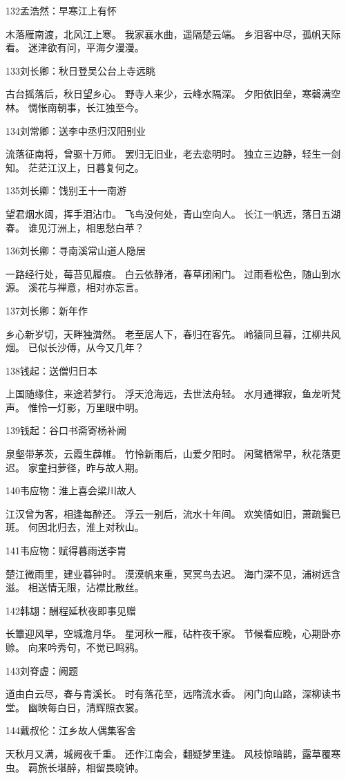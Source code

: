 132孟浩然：早寒江上有怀

木落雁南渡，北风江上寒。
我家襄水曲，遥隔楚云端。
乡泪客中尽，孤帆天际看。
迷津欲有问，平海夕漫漫。

133刘长卿：秋日登吴公台上寺远眺

古台摇落后，秋日望乡心。
野寺人来少，云峰水隔深。
夕阳依旧垒，寒磬满空林。
惆怅南朝事，长江独至今。

134刘常卿：送李中丞归汉阳别业

流落征南将，曾驱十万师。
罢归无旧业，老去恋明时。
独立三边静，轻生一剑知。
茫茫江汉上，日暮复何之。

135刘长卿：饯别王十一南游

望君烟水阔，挥手泪沾巾。
飞鸟没何处，青山空向人。
长江一帆远，落日五湖春。
谁见汀洲上，相思愁白苹？

136刘长卿：寻南溪常山道人隐居

一路经行处，莓苔见履痕。
白云依静渚，春草闭闲门。
过雨看松色，随山到水源。
溪花与禅意，相对亦忘言。

137刘长卿：新年作

乡心新岁切，天畔独潸然。
老至居人下，春归在客先。
岭猿同旦暮，江柳共风烟。
已似长沙傅，从今又几年？

138钱起：送僧归日本

上国随缘住，来途若梦行。
浮天沧海远，去世法舟轻。
水月通禅寂，鱼龙听梵声。
惟怜一灯影，万里眼中明。

139钱起：谷口书斋寄杨补阙

泉壑带茅茨，云霞生薜帷。
竹怜新雨后，山爱夕阳时。
闲鹭栖常早，秋花落更迟。
家童扫萝径，昨与故人期。

140韦应物：淮上喜会梁川故人

江汉曾为客，相逢每醉还。
浮云一别后，流水十年间。
欢笑情如旧，萧疏鬓已斑。
何因北归去，淮上对秋山。

141韦应物：赋得暮雨送李胄

楚江微雨里，建业暮钟时。
漠漠帆来重，冥冥鸟去迟。
海门深不见，浦树远含滋。
相送情无限，沾襟比散丝。

142韩翃：酬程延秋夜即事见赠

长簟迎风早，空城澹月华。
星河秋一雁，砧杵夜千家。
节候看应晚，心期卧亦赊。
向来吟秀句，不觉已鸣鸦。

143刘脊虚：阙题

道由白云尽，春与青溪长。
时有落花至，远隋流水香。
闲门向山路，深柳读书堂。
幽映每白日，清辉照衣裳。

144戴叔伦：江乡故人偶集客舍

天秋月又满，城阙夜千重。
还作江南会，翻疑梦里逢。
风枝惊暗鹊，露草覆寒虫。
羁旅长堪醉，相留畏晓钟。

